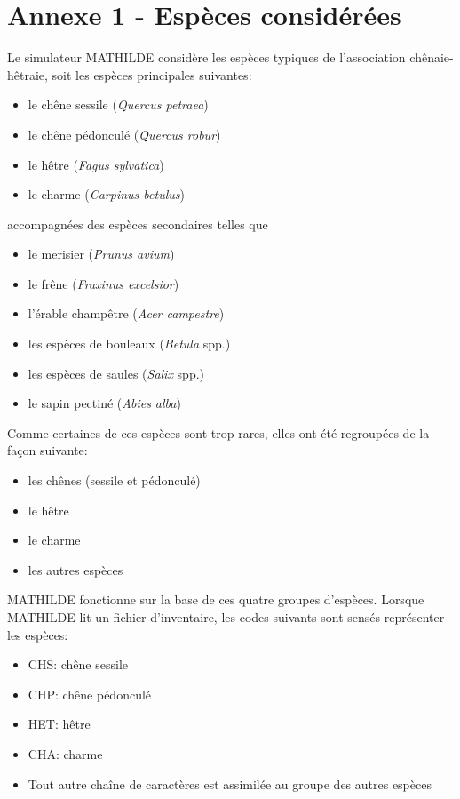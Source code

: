 \documentclass[a4paper,12pt]{article}
\begin{document}
\newpage




\newpage

\appendix

\section{Annexe 1 - Espèces considérées}
\label{Annexe1}

Le simulateur MATHILDE considère les espèces typiques de l'association chênaie-hêtraie, soit les espèces principales suivantes:

\begin{itemize}
  \item le chêne sessile (\textit{Quercus petraea})
  \item le chêne pédonculé (\textit{Quercus robur})
  \item le hêtre (\textit{Fagus sylvatica})
  \item le charme (\textit{Carpinus betulus})
\end{itemize}

accompagnées des espèces secondaires telles que

\begin{itemize}
  \item le merisier (\textit{Prunus avium})
  \item le frêne (\textit{Fraxinus excelsior})
  \item l'érable champêtre (\textit{Acer campestre})
  \item les espèces de bouleaux (\textit{Betula} spp.)
  \item les espèces de saules (\textit{Salix} spp.)
  \item le sapin pectiné (\textit{Abies alba})
\end{itemize}

Comme certaines de ces espèces sont trop rares, elles ont été regroupées de la façon suivante: 

\begin{itemize}
  \item les chênes (sessile et pédonculé)
  \item le hêtre
  \item le charme
  \item les autres espèces
\end{itemize}

MATHILDE fonctionne sur la base de ces quatre groupes d'espèces. Lorsque MATHILDE lit un fichier d'inventaire, les codes suivants sont sensés représenter les espèces:

\begin{itemize}
  \item CHS: chêne sessile
  \item CHP: chêne pédonculé
  \item HET: hêtre
  \item CHA: charme
  \item Tout autre chaîne de caractères est assimilée au groupe des autres espèces
\end{itemize}
\end{document}
